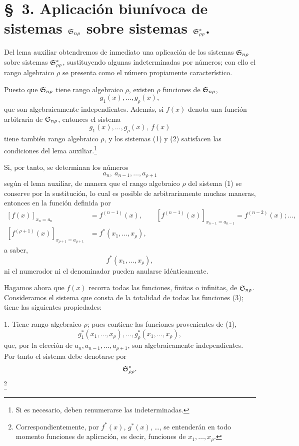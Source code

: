 \documentclass[11pt]{article}
\begin{document}
\section*{\S\ 3. Aplicación biunívoca de sistemas $\mathfrak{S}_{n\rho}$ sobre sistemas $\mathfrak{S}^*_{\rho\rho}$.}

Del lema auxiliar obtendremos de inmediato una aplicación de los sistemas $\mathfrak{S}_{n\rho}$ sobre sistemas $\mathfrak{S}^*_{\rho\rho}$, sustituyendo algunas indeterminadas por números; con ello el rango algebraico $\rho$ se presenta como el número propiamente característico.

Puesto que $\mathfrak{S}_{n\rho}$ tiene rango algebraico $\rho$, existen $\rho$ funciones de $\mathfrak{S}_{n\rho}$,
\begin{equation}
  g_1(x),\ldots,g_\rho(x),
\tag{1}
\end{equation}
que son algebraicamente independientes. Además, si $f(x)$ denota una función arbitraria de $\mathfrak{S}_{n\rho}$, entonces el sistema
\begin{equation}
  g_1(x),\ldots,g_\rho(x),\ f(x)
\tag{2}
\end{equation}
tiene también rango algebraico $\rho$, y los sistemas (1) y (2) satisfacen las condiciones del lema auxiliar.\footnote{Si es necesario, deben renumerarse las indeterminadas.}

Si, por tanto, se determinan los números
\[
  a_n,\ a_{n-1},\ldots,a_{\rho+1}
\]
según el lema auxiliar, de manera que el rango algebraico $\rho$ del sistema (1) se conserve por la sustitución, lo cual es posible de arbitrariamente muchas maneras, entonces en la función definida por
\[
\begin{aligned}
 [f(x)]_{x_n=a_n}&=f^{(n-1)}(x),\qquad
 [f^{(n-1)}(x)]_{x_{n-1}=a_{n-1}}=f^{(n-2)}(x);\ldots,\\
 [f^{(\rho+1)}(x)]_{x_{\rho+1}=a_{\rho+1}}&=f^*(x_1,\ldots,x_\rho),
\end{aligned}
\]
a saber,
\begin{equation}
  f^*(x_1,\ldots,x_\rho),
\tag{3}
\end{equation}
ni el numerador ni el denominador pueden anularse idénticamente.

Hagamos ahora que $f(x)$ recorra todas las funciones, finitas o infinitas, de $\mathfrak{S}_{n\rho}$. Consideramos el sistema que consta de la totalidad de todas las funciones (3); tiene las siguientes propiedades:

1. Tiene rango algebraico $\rho$; pues contiene las funciones provenientes de (1),
\[
  g_1^*(x_1,\ldots,x_\rho),\ldots,g_\rho^*(x_1,\ldots,x_\rho),
\]
que, por la elección de $a_n,a_{n-1},\ldots,a_{\rho+1}$, son algebraicamente independientes. Por tanto el sistema debe denotarse por
\[
  \mathfrak{S}^*_{\rho\rho}.
\]
\footnote{Correspondientemente, por $f^*(x)$, $g^*(x)$, \ldots, se entenderán en todo momento funciones de aplicación, es decir, funciones de $x_1,\ldots,x_\rho$.}
\end{document}
